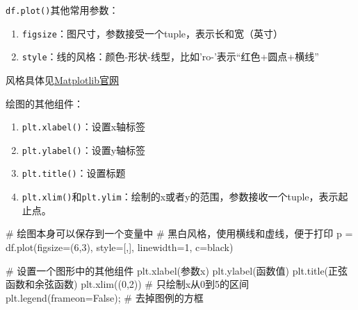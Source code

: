 \documentclass[
  letterpaper,
  DIV=11,
  numbers=noendperiod]{scrreprt}
\newenvironment{Shaded}{\begin{snugshade}}{\end{snugshade}}
\newcommand{\CommentTok}[1]{\textcolor[rgb]{0.37,0.37,0.37}{#1}}
\newcommand{\DecValTok}[1]{\textcolor[rgb]{0.68,0.00,0.00}{#1}}
\newcommand{\NormalTok}[1]{\textcolor[rgb]{0.00,0.23,0.31}{#1}}
\newcommand{\OperatorTok}[1]{\textcolor[rgb]{0.37,0.37,0.37}{#1}}
\newcommand{\StringTok}[1]{\textcolor[rgb]{0.13,0.47,0.30}{#1}}
\newcommand{\VariableTok}[1]{\textcolor[rgb]{0.07,0.07,0.07}{#1}}
\providecommand{\tightlist}{%
  \setlength{\itemsep}{0pt}\setlength{\parskip}{0pt}}\usepackage{longtable,booktabs,array}
\begin{document}
\texttt{df.plot()}其他常用参数：

\begin{enumerate}
\def\labelenumi{\arabic{enumi}.}
\tightlist
\item
  \texttt{figsize}：图尺寸，参数接受一个tuple，表示长和宽（英寸）
\item
  \texttt{style}：线的风格：颜色-形状-线型，比如'ro-'表示``红色+圆点+横线''
\end{enumerate}

风格具体见\href{https://matplotlib.org/2.1.2/api/_as_gen/matplotlib.pyplot.plot.html}{Matplotlib官网}

绘图的其他组件：

\begin{enumerate}
\def\labelenumi{\arabic{enumi}.}
\tightlist
\item
  \texttt{plt.xlabel()}：设置x轴标签
\item
  \texttt{plt.ylabel()}：设置y轴标签
\item
  \texttt{plt.title()}：设置标题
\item
  \texttt{plt.xlim()}和\texttt{plt.ylim}：绘制的x或者y的范围，参数接收一个tuple，表示起止点。
\end{enumerate}

\begin{Shaded}
\begin{Highlighting}[]
\CommentTok{\# 绘图本身可以保存到一个变量中}
\CommentTok{\# 黑白风格，使用横线和虚线，便于打印}
\NormalTok{p }\OperatorTok{=}\NormalTok{ df.plot(figsize}\OperatorTok{=}\NormalTok{(}\DecValTok{6}\NormalTok{,}\DecValTok{3}\NormalTok{), style}\OperatorTok{=}\NormalTok{[}\StringTok{\textquotesingle{}{-}\textquotesingle{}}\NormalTok{,}\StringTok{\textquotesingle{}{-}{-}\textquotesingle{}}\NormalTok{], linewidth}\OperatorTok{=}\DecValTok{1}\NormalTok{, c}\OperatorTok{=}\StringTok{\textquotesingle{}black\textquotesingle{}}\NormalTok{) }


\CommentTok{\# 设置一个图形中的其他组件}
\NormalTok{plt.xlabel(}\StringTok{\textquotesingle{}参数x\textquotesingle{}}\NormalTok{)}
\NormalTok{plt.ylabel(}\StringTok{\textquotesingle{}函数值\textquotesingle{}}\NormalTok{)}
\NormalTok{plt.title(}\StringTok{\textquotesingle{}正弦函数和余弦函数\textquotesingle{}}\NormalTok{)}
\NormalTok{plt.xlim((}\DecValTok{0}\NormalTok{,}\DecValTok{2}\NormalTok{)) }\CommentTok{\# 只绘制x从0到5的区间}
\NormalTok{plt.legend(frameon}\OperatorTok{=}\VariableTok{False}\NormalTok{)}\OperatorTok{;} \CommentTok{\# 去掉图例的方框}
\end{Highlighting}
\end{Shaded}
\end{document}

